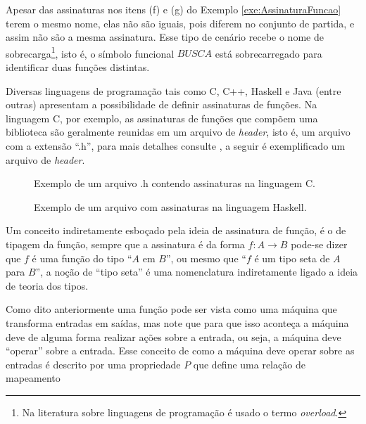\begin{atencao}
  Apesar das assinaturas nos itens (f) e (g) do Exemplo \ref{exe:AssinaturaFuncao} terem o mesmo nome, elas não são iguais, pois diferem no conjunto de partida, e assim não são a mesma assinatura. Esse tipo de cenário recebe o nome de sobrecarga\footnote{Na literatura sobre linguagens de programação é usado o termo \textit{overload}.}, isto é, o símbolo funcional $BUSCA$ está sobrecarregado para identificar duas funções distintas.
\end{atencao}

Diversas linguagens de programação tais como C, C++, Haskell e Java (entre outras) apresentam a possibilidade de definir assinaturas de funções. Na linguagem C, por exemplo, as assinaturas de funções que compõem uma biblioteca são geralmente reunidas em um arquivo de \textit{header}, isto é, um arquivo com a extensão ``.h'', para mais detalhes consulte \cite{paulo2009algoritmos}, a seguir é exemplificado um arquivo de \textit{header}.

\begin{figure}[h]
	
	\caption{Exemplo de um arquivo .h contendo assinaturas na linguagem C.}
	\label{fig:AssinaturasEmC}
\end{figure}

\begin{figure}[h]
	
	\caption{Exemplo de um arquivo com assinaturas na linguagem Haskell.}
	\label{fig:AssinaturasEmHaskell}
\end{figure}

Um conceito indiretamente esboçado pela ideia de assinatura de função, é o de tipagem da função, sempre que a assinatura é da forma $f: A \rightarrow B$ pode-se dizer que $f$ é uma função do tipo ``$A$ em $B$'', ou mesmo que ``$f$ é um tipo seta de $A$ para $B$'', a noção de ``tipo seta'' é uma nomenclatura indiretamente ligado a ideia de teoria dos tipos.

Como dito anteriormente uma função pode ser vista como uma máquina que transforma entradas em saídas, mas note que para que isso aconteça a máquina deve de alguma forma realizar ações sobre a entrada, ou seja, a máquina deve ``operar'' sobre a entrada. Esse conceito de como a máquina deve operar sobre as entradas é descrito por uma propriedade $P$ que define uma relação de mapeamento

